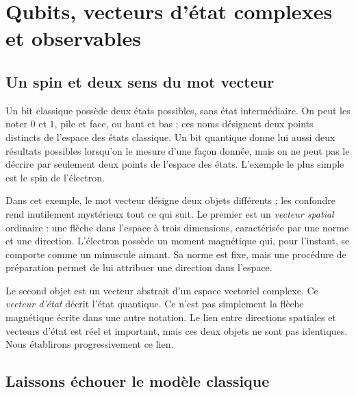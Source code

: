 \chapter{Qubits, vecteurs d’état complexes et observables}


\section{Un spin et deux sens du mot vecteur}

Un bit classique possède deux états possibles, sans état intermédiaire. On peut les noter \(0\) et \(1\), pile et face, ou haut et bas ; ces noms désignent deux points distincts de l’espace des états classique. Un bit quantique donne lui aussi deux résultats possibles lorsqu’on le mesure d’une façon donnée, mais on ne peut pas le décrire par seulement deux points de l’espace des états. L’exemple le plus simple est le spin de l’électron.

Dans cet exemple, le mot vecteur désigne deux objets différents ; les confondre rend inutilement mystérieux tout ce qui suit. Le premier est un \emph{vecteur spatial} ordinaire : une flèche dans l’espace à trois dimensions, caractérisée par une norme et une direction. L’électron possède un moment magnétique qui, pour l’instant, se comporte comme un minuscule aimant. Sa norme est fixe, mais une procédure de préparation permet de lui attribuer une direction dans l’espace.

Le second objet est un vecteur abstrait d’un espace vectoriel complexe. Ce \emph{vecteur d’état} décrit l’état quantique. Ce n’est pas simplement la flèche magnétique écrite dans une autre notation. Le lien entre directions spatiales et vecteurs d’état est réel et important, mais ces deux objets ne sont pas identiques. Nous établirons progressivement ce lien.

\section{Laissons échouer le modèle classique}

